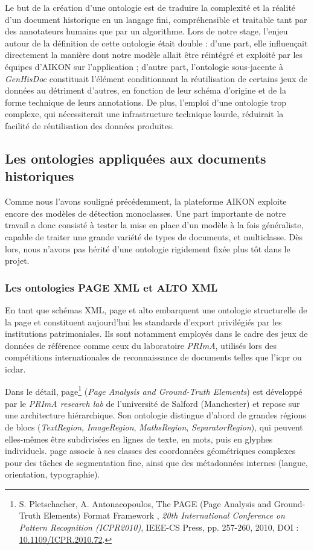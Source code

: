 Le but de la création d'une ontologie est de traduire la complexité et la réalité d'un document historique en un langage fini, compréhensible et traitable tant par des annotateurs humains que par un algorithme. Lors de notre stage, l'enjeu autour de la définition de cette ontologie était double : d'une part, elle influençait directement la manière dont notre modèle allait être réintégré et exploité par les équipes d'AIKON sur l'application ; d'autre part, l'ontologie sous-jacente à \textit{GenHisDoc} constituait l'élément conditionnant la réutilisation de certains jeux de données au détriment d'autres, en fonction de leur schéma d'origine et de la forme technique de leurs annotations. De plus, l'emploi d'une ontologie trop complexe, qui nécessiterait une infrastructure technique lourde, réduirait la facilité de réutilisation des données produites.

\subsection{Les ontologies appliquées aux documents historiques}

Comme nous l'avons souligné précédemment, la plateforme AIKON exploite encore des modèles de détection monoclasses. Une part importante de notre travail a donc consisté à tester la mise en place d'un modèle à la fois généraliste, capable de traiter une grande variété de types de documents, et multiclasse. Dès lors, nous n'avons pas hérité d'une ontologie rigidement fixée plus tôt dans le projet.

\subsubsection{Les ontologies PAGE XML et ALTO XML}

En tant que schémas XML, \gls{page} et \gls{alto} embarquent une ontologie structurelle de la page et constituent aujourd'hui les standards d'export privilégiés par les institutions patrimoniales. Ils sont notamment employés dans le cadre des jeux de données de référence comme ceux du laboratoire \textit{PRImA}, utilisés lors des compétitions internationales de reconnaissance de documents telles que l'\gls{icpr} ou \gls{icdar}.

Dans le détail, \gls{page}\footnote{S. Pletschacher, A. Antonacopoulos, \og The PAGE (Page Analysis and Ground-Truth Elements) Format Framework \fg, \textit{20th International Conference on Pattern Recognition (ICPR2010)}, IEEE-CS Press, pp. 257-260, 2010, DOI : \href{https://doi.org/10.1109/ICPR.2010.72}{10.1109/ICPR.2010.72}.} (\textit{Page Analysis and Ground-Truth Elements}) est développé par le \textit{PRImA research lab} de l'université de Salford (Manchester) et repose sur une architecture hiérarchique. Son ontologie distingue d'abord de grandes régions de blocs (\textit{TextRegion}, \textit{ImageRegion}, \textit{MathsRegion}, \textit{SeparatorRegion}), qui peuvent elles-mêmes être subdivisées en lignes de texte, en mots, puis en glyphes individuels. \gls{page} associe à ses classes des coordonnées géométriques complexes pour des tâches de segmentation fine, ainsi que des métadonnées internes (langue, orientation, typographie).

